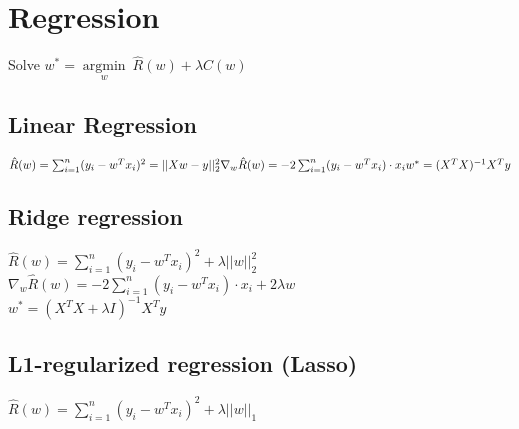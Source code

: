 \section*{Regression}

Solve $w^* = \underset{w}{\operatorname{argmin}} ~ \hat{R}(w)+ \lambda C(w)$

\subsection*{Linear Regression}

$\hat{R}(w) = \sum_{i=1}^n (y_i - w^Tx_i)^2 = ||Xw-y||^2_2\\
\nabla_w \hat{R}(w) = -2 \sum_{i=1}^n (y_i-w^T x_i) \cdot x_i \\
w^* = (X^T X)^{-1} X^T y$


\subsection*{Ridge regression}

$\hat{R}(w) = \sum_{i=1}^n (y_i - w^Tx_i)^2 + \lambda ||w||_2^2$\\
$\nabla_w \hat{R}(w) = -2 \sum_{i=1}^n (y_i-w^T x_i) \cdot x_i + 2 \lambda w$\\
$w^*=(X^T X + \lambda I)^{-1} X^T y$

\subsection*{L1-regularized regression (Lasso)}
$\hat{R}(w) = \sum_{i=1}^n (y_i - w^Tx_i)^2 + \lambda ||w||_1$